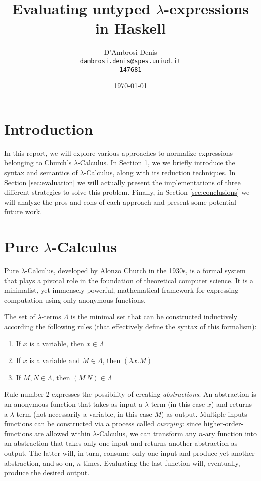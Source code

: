 \documentclass{article}
\title{Evaluating untyped $\lambda$-expressions in Haskell}
\author{D'Ambrosi Denis \\ \small \texttt{dambrosi.denis@spes.uniud.it} \\ \small \texttt{147681}}
\date{\today}
\begin{document}
\maketitle

\begin{abstract}
\end{abstract}

\tableofcontents

\newpage

\section*{Introduction}

In this report, we will explore various approaches to normalize expressions belonging to Church's $\lambda$-Calculus. In Section \ref{sec:lambdaintro}, we we briefly introduce the syntax and semantics of $\lambda$-Calculus, along with its reduction techniques. In Section \ref{sec:evaluation} we will actually present the implementations of three different strategies to solve this problem. Finally, in Section \ref{sec:conclusions} we will analyze the pros and cons of each approach and present some potential future work.

\section{Pure $\lambda$-Calculus} \label{sec:lambdaintro}

Pure $\lambda$-Calculus, developed by Alonzo Church in the 1930s, is a formal system that plays a pivotal role in the foundation of theoretical computer science. It is a minimalist, yet immensely powerful, mathematical framework for expressing computation using only anonymous functions.

The set of $\lambda$-terms $\Lambda$ is the minimal set that can be constructed inductively according the following rules (that effectively define the syntax of this formalism):

\begin{enumerate}
    \item If $x$ is a variable, then $x \in \Lambda$
    \item If $x$ is a variable and $M \in \Lambda$, then $(\lambda x . M)$
    \item If $M,N \in \Lambda$, then $(M\ N) \in \Lambda$
\end{enumerate}

Rule number 2 expresses the possibility of creating \textit{abstractions}. An abstraction is an anonymous function that takes as input a $\lambda$-term (in this case $x$) and returns a $\lambda$-term (not necessarily a variable, in this case $M$) as output. Multiple inputs functions can be constructed via a process called \textit{currying}: since higher-order-functions are allowed within $\lambda$-Calculus, we can transform any $n$-ary function into an abstraction that takes only one input and returns another abstraction as output. The latter will, in turn, consume only one input and produce yet another abstraction, and so on, $n$ times. Evaluating the last function will, eventually, produce the desired output.
\end{document}
